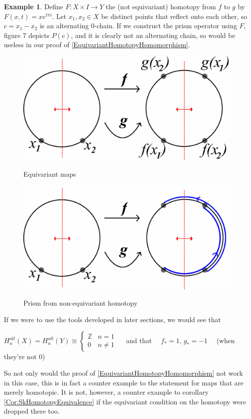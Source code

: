 \documentclass[11pt,a4paper,twoside]{article}
\theoremstyle{plain}
\theoremstyle{definition}
\theoremstyle{definition}
\theoremstyle{definition}
\theoremstyle{definition}
\newtheorem{example}[thm]{Example}
\theoremstyle{definition}
\begin{document}
\begin{example}
Define  $F\!:\!X\!\times\! I\rightarrow Y$ the (not equivariant) homotopy from $f$ to $g$ by $F(x,t)=xe^{t\pi i}$. Let $x_1,x_2\in X$ be distinct points that reflect onto each other, so $c=x_1-x_2$ is an alternating $0$-chain. If we construct the prism operator using $F$, figure 7 depicts $P(c)$, and it is clearly not an alternating chain, so would be useless in our proof of \ref{EquivariantHomotopyHomomorphism}.
\begin{figure}
\begin{minipage}{.49\textwidth}
\centering
\includegraphics[scale=0.12]{Images/NonEquivariantHomotopy.jpg}
\label{fig:NonEquivariantHomotopy}
\caption{Equivariant maps}
\end{minipage}
\begin{minipage}{.49\textwidth}
\includegraphics[scale=0.12]{Images/NonEquivariantHomotopyPrism.jpg}
\label{fig:NonEquivariantHomotopyPrism}
\caption{Prism from non-equivariant homotopy}
\end{minipage}
\end{figure}
\end{example}

If we were to use the tools developed in later sections, we would see that \begin{center}$H_n^{alt}(X)=H_n^{alt}(Y)\cong\begin{cases}\mathbb{Z} & n\!=\!1\\0 & n\!\neq\!1\end{cases} \quad$ and that $\quad f_*=1,\,g_*=-1\quad$ (when they're not $0$)\end{center}
So not only would the proof of \ref{EquivariantHomotopyHomomorphism} not work in this case, this is in fact a counter example to the statement for maps that are merely homotopic. It is not, however, a counter example to corollary \ref{Cor:SkHomotopyEquivalence} if the equivariant condition on the homotopy were dropped there too.
\end{document}
